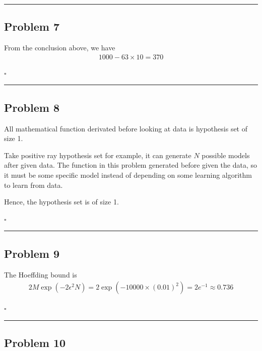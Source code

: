 \documentclass[12pt]{article}
\newcommand*{\QEDB}{\hfill\ensuremath{\square}}
\newcommand{\ParTh}[1]{\left(#1\right)}
\newcommand{\horrule}[1]{\rule{\linewidth}{#1}}
\begin{document}
\horrule{0.5pt}

\subsection*{Problem 7}

From the conclusion above, we have
\begin{align}
1000-63\times10=370
\end{align}

\QEDB

\horrule{0.5pt}

\subsection*{Problem 8}

All mathematical function derivated before looking at data is hypothesis set of size 1.

Take positive ray hypothesis set for example, it can generate $N$ possible models after given data. The function in this problem generated before given the data, so it must be some specific model instead of depending on some learning algorithm to learn from data.

Hence, the hypothesis set is of size 1.

\QEDB

\horrule{0.5pt}

\subsection*{Problem 9}

The Hoeffding bound is
\begin{align}
2M\exp\ParTh{-2\epsilon^2N}=2\exp\ParTh{-10000\times\ParTh{0.01}^2}=2e^{-1}\approx0.736
\end{align}

\QEDB

\horrule{0.5pt}

\subsection*{Problem 10}
\end{document}
